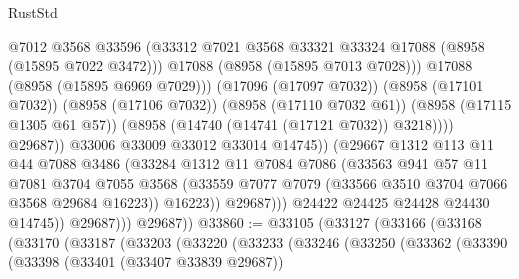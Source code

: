 \begin{lexlean}{RustStd}
\begin{coremodule}
                                      @7012
                                      @3568
                                      @33596
                                      (@33312
                                        @7021
                                        @3568
                                        @33321
                                        @33324
                                        @17088
                                        (@8958 (@15895 @7022 @3472)))
                                      @17088
                                      (@8958 (@15895 @7013 @7028)))
                                    @17088
                                    (@8958 (@15895 @6969 @7029)))
                                  (@17096 (@17097 @7032))
                                  (@8958 (@17101 @7032))
                                  (@8958 (@17106 @7032))
                                  (@8958 (@17110 @7032 @61))
                                  (@8958 (@17115 @1305 @61 @57))
                                  (@8958 (@14740 (@14741 (@17121 @7032)) @3218))))
                              @29687))
                          @33006
                          @33009
                          @33012
                          @33014
                          @14745))
                      (@29667
                        @1312
                        @113
                        @11
                        @44
                        @7088
                        @3486
                        (@33284
                          @1312
                          @11
                          @7084
                          @7086
                          (@33563
                            @941
                            @57
                            @11
                            @7081
                            @3704
                            @7055
                            @3568
                            (@33559 @7077 @7079 (@33566 @3510 @3704 @7066 @3568 @29684 @16223))
                            @16223))
                        @29687)))
                  @24422
                  @24425
                  @24428
                  @24430
                  @14745))
              @29687)))
        @29687))
@33860 := @33105
    (@33127
      (@33166
        (@33168
          (@33170
            (@33187
              (@33203
                (@33220
                  (@33233
                    (@33246
                      (@33250
                        (@33362
                          (@33390
                            (@33398
                              (@33401 (@33407 @33839 @29687))

\end{coremodule}
\end{lexlean}
